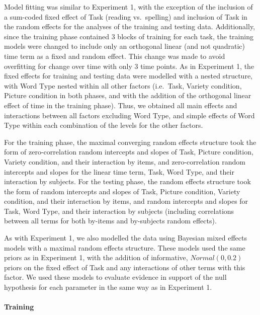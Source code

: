 \documentclass[doc,floatsintext]{apa6}
\let\oldparagraph\paragraph
\renewcommand{\paragraph}[1]{\oldparagraph{#1}\mbox{}}
\begin{document}
Model fitting was similar to Experiment 1, with the exception of the
inclusion of a sum-coded fixed effect of Task (reading vs.~spelling) and
inclusion of Task in the random effects for the analyses of the training
and testing data. Additionally, since the training phase contained 3
blocks of training for each task, the training models were changed to
include only an orthogonal linear (and not quadratic) time term as a
fixed and random effect. This change was made to avoid overfitting for
change over time with only 3 time points. As in Experiment 1, the fixed
effects for training and testing data were modelled with a nested
structure, with Word Type nested within all other factors (i.e.~Task,
Variety condition, Picture condition in both phases, and with the
addition of the orthogonal linear effect of time in the training phase).
Thus, we obtained all main effects and interactions between all factors
excluding Word Type, and simple effects of Word Type within each
combination of the levels for the other factors.

For the training phase, the maximal converging random effects structure
took the form of zero-correlation random intercepts and slopes of Task,
Picture condition, Variety condition, and their interaction by items,
and zero-correlation random intercepts and slopes for the linear time
term, Task, Word Type, and their interaction by subjects. For the
testing phase, the random effects structure took the form of random
intercepts and slopes of Task, Picture condition, Variety condition, and
their interaction by items, and random intercepts and slopes for Task,
Word Type, and their interaction by subjects (including correlations
between all terms for both by-items and by-subjects random effects).

As with Experiment 1, we also modelled the data using Bayesian mixed
effects models with a maximal random effects structure. These models
used the same priors as in Experiment 1, with the addition of
informative, \(Normal(0, 0.2)\) priors on the fixed effect of Task and
any interactions of other terms with this factor. We used these models
to evaluate evidence in support of the null hypothesis for each
parameter in the same way as in Experiment 1.

\paragraph{Training}\label{training-1}
\end{document}
